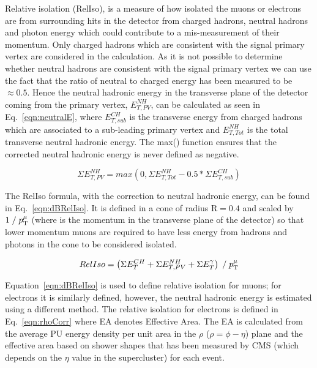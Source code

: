Relative isolation (RelIso), is a measure of how isolated the muons or electrons are from surrounding hits in the detector from charged hadrons, neutral hadrons and photon energy which could contribute to a mis-measurement of their momentum. Only charged hadrons which are consistent with the signal primary vertex are considered in the calculation. As it is not possible to determine whether neutral hadrons are consistent with the signal primary vertex we can use the fact that the ratio of neutral to charged energy has been measured to be $\approx 0.5$. Hence the neutral hadronic energy in the transverse plane of the detector coming from the primary vertex, $E_{T,PV}^{NH}$, can be calculated as seen in Eq.~\ref{eqn:neutralE}, where $E_{T,sub}^{CH}$ is the transverse energy from charged hadrons which are associated to a sub-leading primary vertex and $E_{T,Tot}^{NH}$ is the total transverse neutral hadronic energy. 
 The max() function ensures that the corrected neutral hadronic energy is never defined as negative.


\begin{centering}
\begin{equation}
\Sigma E_{T,PV}^{NH}  =  max(0, \Sigma E_{T,Tot}^{NH} - 0.5*\Sigma E_{T,sub}^{CH})
\label{eqn:neutralE}
\end{equation}
\end{centering}



The RelIso formula, with the correction to neutral hadronic energy, can be found in Eq.~\ref{eqn:dBRelIso}. It is defined in a cone of radius $\textrm{R}=0.4$ and scaled by $1\; / \;p_{\mathrm{T}}^{\mu}$ (where \pt is the momentum in the transverse plane of the detector) so that lower momentum muons are required to have less energy from hadrons and photons in the cone to be considered isolated.

\begin{centering}
\begin{equation}
RelIso = \left( \Sigma E_{T}^{CH} + \Sigma E_{T,PV}^{NH} +  \Sigma E_{T}^{\gamma} \right) \; / \;   p_{\mathrm{T}}^{\mu}
\label{eqn:dBRelIso}
\end{equation}
\end{centering}


Equation~\ref{eqn:dBRelIso} is used to define relative isolation for muons; for electrons it is similarly defined, however, the neutral hadronic energy is estimated using a different method. The relative isolation for electrons is defined in Eq.~\ref{eqn:rhoCorr} where EA denotes Effective Area. The EA is calculated from the average PU energy density per unit area in the $\rho$ ($\rho=\phi-\eta$) plane and the effective area based on shower shapes that has been measured by CMS (which depends on the $\eta$ value in the supercluster) for each event.

